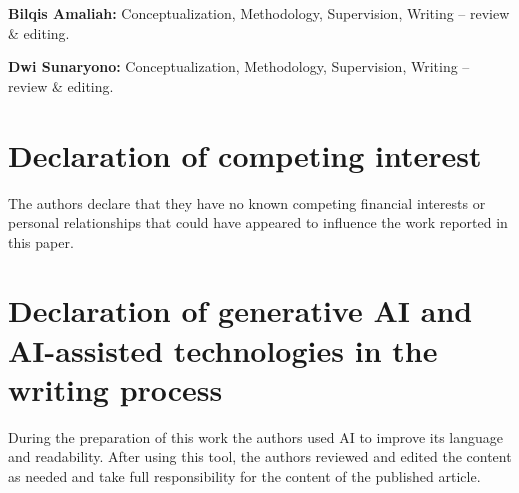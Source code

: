 \documentclass[a4paper,fleqn]{cas-dc}
\begin{document}
\noindent
\textbf{Bilqis Amaliah:}
Conceptualization, Methodology, Supervision, Writing -- review \& editing.

\noindent
\textbf{Dwi Sunaryono:}
Conceptualization, Methodology, Supervision, Writing -- review \& editing.

\section*{Declaration of competing interest}

The authors declare that they have no known competing financial interests or
personal relationships that could have appeared to influence the work reported in
this paper.


\section*{Declaration of generative AI and AI-assisted technologies in the writing process}
During the preparation of this work the authors used AI to improve its language and readability. After using this tool, the authors reviewed and edited the content as needed and take full responsibility for the content of the published article.


\FloatBarrier
\appendix
\end{document}
